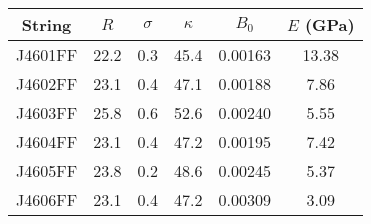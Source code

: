 \begin{tabular}{cccccc}
\toprule
String & $R$ & $\sigma$ & $\kappa$ & $B_0$ & $E$ (GPa) \\
\midrule
J4601FF & 22.2 & 0.3 & 45.4 & 0.00163 & 13.38 \\
J4602FF & 23.1 & 0.4 & 47.1 & 0.00188 & 7.86 \\
J4603FF & 25.8 & 0.6 & 52.6 & 0.00240 & 5.55 \\
J4604FF & 23.1 & 0.4 & 47.2 & 0.00195 & 7.42 \\
J4605FF & 23.8 & 0.2 & 48.6 & 0.00245 & 5.37 \\
J4606FF & 23.1 & 0.4 & 47.2 & 0.00309 & 3.09 \\
\bottomrule
\end{tabular}

